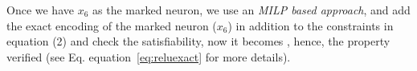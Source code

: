   \begin{minipage}{0.4\linewidth}
Once we have  $x_6$ as the marked neuron, we use an {\em MILP based approach}, and add the exact encoding of the marked neuron ($x_6$) in addition to the constraints in equation (2) %
and check the satisfiability, now it becomes \unsat{}, hence, the property verified (see Eq. equation~\ref{eq:reluexact} for more details).
\end{minipage}






        





